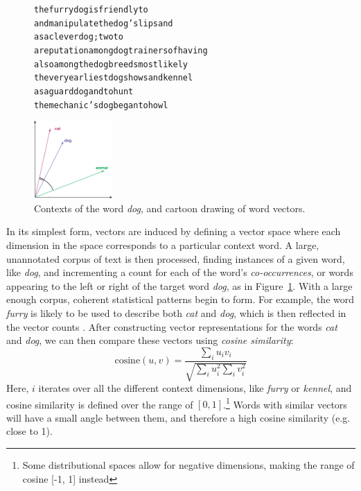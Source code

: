 \documentclass[12pt]{article}
\begin{document}
\begin{figure}
\centering
\begin{minipage}{7cm}
\begin{scriptsize}
\begin{alltt}
         the furry {dog} is friendly to
and manipulate the {dog} 's lips and
       as a clever {dog} ; two to
a reputation among {dog} trainers of having
    also among the {dog} breeds most likely
 the very earliest {dog} shows and kennel
        as a guard {dog} and to hunt
   the mechanic 's {dog} began to howl
\end{alltt}
\end{scriptsize}
\end{minipage}\qquad
\begin{minipage}{3cm}
\includegraphics[width=3cm]{figures/vsm}
\end{minipage}
\caption{Contexts of the word {\em dog}, and cartoon drawing
of word vectors.}
\label{fig:vsm}
\end{figure}

In its simplest form, vectors are induced by defining a vector space where
each dimension in the space corresponds to a particular context word. A large,
unannotated corpus of text is then processed, finding instances of a given word,
like {\em dog}, and incrementing a count for each of the word's {\em
co-occurrences}, or words appearing to the left or right of the target word
{\em dog}, as in Figure~\ref{fig:vsm}. With a large enough corpus, coherent
statistical patterns begin to form. For example, the word {\em furry} is likely
to be used to describe both {\em cat} and {\em dog}, which is then reflected in
the vector counts \cite{lund:1996:brmic}. After constructing vector
representations for the words {\em cat} and {\em dog}, we can then compare
these vectors using {\em cosine similarity}:
\begin{equation}
  \text{cosine}(u, v) = \frac{\sum_i u_iv_i}{\sqrt{\sum_i u_i^2 \sum_i v_i^2}}
\end{equation}
Here, $i$ iterates over all the different context dimensions, like {\em furry}
or {\em kennel}, and cosine similarity is defined over the range of $[0,
1]$.\footnote{Some distributional spaces allow for negative dimensions, making
the range of cosine [-1, 1] instead} Words with similar vectors will have a
small angle between them, and therefore a high cosine similarity (e.g. close to
1).
\end{document}
